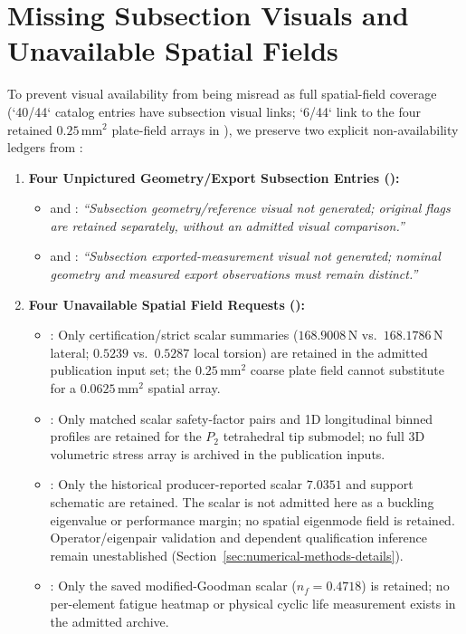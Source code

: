 \section{Missing Subsection Visuals and Unavailable Spatial Fields}
\label{sup:missing-disclosures}

To prevent visual availability from being misread as full spatial-field coverage (`40/44` catalog entries have subsection visual links; `6/44` link to the four retained $0.25\,\mathrm{mm}^2$ plate-field arrays in ), we preserve two explicit non-availability ledgers from :
\begin{enumerate}
  \item \textbf{Four Unpictured Geometry/Export Subsection Entries ():}
    \begin{itemize}
      \item {} and : \emph{``Subsection geometry/reference visual not generated; original flags are retained separately, without an admitted visual comparison.''}
      \item {} and : \emph{``Subsection exported-measurement visual not generated; nominal geometry and measured export observations must remain distinct.''}
    \end{itemize}
  \item \textbf{Four Unavailable Spatial Field Requests ():}
    \begin{itemize}
      \item {}: Only certification/strict scalar summaries ($168.9008\,\mathrm{N}$ vs.\ $168.1786\,\mathrm{N}$ lateral; $0.5239$ vs.\ $0.5287$ local torsion) are retained in the admitted publication input set; the $0.25\,\mathrm{mm}^2$ coarse plate field cannot substitute for a $0.0625\,\mathrm{mm}^2$ spatial array.
      \item {}: Only matched scalar safety-factor pairs and 1D longitudinal binned profiles are retained for the $P_2$ tetrahedral tip submodel; no full 3D volumetric stress array is archived in the publication inputs.
      \item {}: Only the historical producer-reported scalar $7.0351$ and support schematic are retained. The scalar is not admitted here as a buckling eigenvalue or performance margin; no spatial eigenmode field is retained. Operator/eigenpair validation and dependent qualification inference remain unestablished (Section~\ref{sec:numerical-methods-details}).
      \item {}: Only the saved modified-Goodman scalar ($n_f = 0.4718$) is retained; no per-element fatigue heatmap or physical cyclic life measurement exists in the admitted archive.
    \end{itemize}
\end{enumerate}
